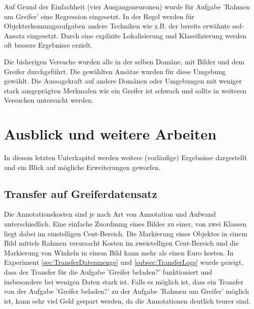 	Auf Grund der Einfachheit (vier Ausgangsneuronen) wurde für  Aufgabe 'Rahmen um Greifer' eine Regression eingesetzt. In der Regel werden für Objekterkennungsaufgaben andere Techniken wie z.B. der bereits erwähnte \ac{ssd}-Ansatz eingesetzt. Durch eine explizite Lokalisierung und Klassifizierung werden oft bessere Ergebnisse erzielt.
	
	Die bisherigen Versuche wurden alle in der selben Domäne, mit  Bilder und dem Greifer durchgeführt. Die gewählten Ansätze wurden für diese Umgebung gewählt. Die Aussagekraft auf andere Domänen oder Umgebungen mit weniger stark ausgeprägten Merkmalen wie ein Greifer ist schwach und sollte in weiteren Versuchen untersucht werden.    
							
	\section{Ausblick und weitere Arbeiten}
	\label{sec:AusblickWeitereArbeiten}
	In diesem letzten Unterkapitel werden weitere (vorläufige) Ergebnisse dargestellt und ein Blick auf mögliche Erweiterungen geworfen.

	\subsection{Transfer auf Greiferdatensatz}
	\label{subsec:TransferGreiferDatensatz}
 	Die Annotationskosten sind je nach Art von Annotation und Aufwand unterschiedlich. Eine einfache Zuordnung eines Bildes zu einer, von zwei Klassen liegt dabei im einstelligen Cent-Bereich. Die Markierung eines Objektes in einem Bild mittels Rahmen verursacht Kosten im zweistelligen Cent-Bereich und die Markierung von Winkeln in einem Bild kann mehr als einen Euro kosten. In Experiment \ref{sec:TransferDatenmenge} und \ref{subsec:TransferLogs} wurde gezeigt, dass der Transfer für die Aufgabe 'Greifer beladen?' funktioniert und insbesondere bei wenigen Daten stark ist. Falls es möglich ist, dass ein Transfer von der Aufgabe 'Greifer beladen?' zu der Aufgabe 'Rahmen um Greifer' möglich ist, kann sehr viel Geld gespart werden, da die Annotationen deutlich teurer sind. 
 	
